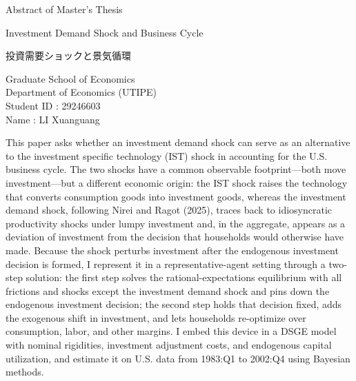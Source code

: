 \documentclass[12pt]{article}
\begin{document}
\begin{center}
{\Large Abstract of Master's Thesis}\par
\vspace{0.8cm}
{\large Investment Demand Shock and Business Cycle}\par
\vspace{0.3cm}
{\normalsize 投資需要ショックと景気循環}\par   %
\vspace{0.8cm}
\end{center}
\begin{flushright}

Graduate School of Economics\\
Department of Economics (UTIPE)\\
Student ID : 29246603\\          %
Name : LI Xuanguang             %

\end{flushright}

\vspace{0.6cm}

This paper asks whether an investment demand shock can serve as an alternative to the investment specific technology (IST) shock in accounting for the U.S. business cycle. The two shocks have a common observable footprint---both move investment---but a different economic origin: the IST shock raises the technology that converts consumption goods into investment goods, whereas the investment demand shock, following Nirei and Ragot (2025), traces back to idiosyncratic productivity shocks under lumpy investment and, in the aggregate, appears as a deviation of investment from the decision that households would otherwise have made. Because the shock perturbs investment after the endogenous investment decision is formed, I represent it in a representative-agent setting through a two-step solution: the first step solves the rational-expectations equilibrium with all frictions and shocks except the investment demand shock and pins down the endogenous investment decision; the second step holds that decision fixed, adds the exogenous shift in investment, and lets households re-optimize over consumption, labor, and other margins. I embed this device in a DSGE model with nominal rigidities, investment adjustment costs, and endogenous capital utilization, and estimate it on U.S. data from 1983:Q1 to 2002:Q4 using Bayesian methods.
\end{document}
